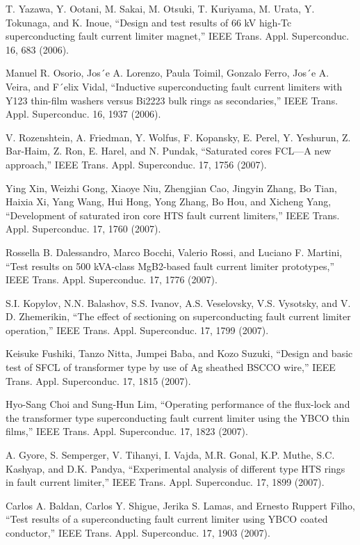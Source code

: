 \noindent [9.134] T. Yazawa, Y. Ootani, M. Sakai, M. Otsuki, T. Kuriyama, M. Urata, Y. Tokunaga,
and K. Inoue, ``Design and test results of 66 kV high-Tc superconducting fault
current limiter magnet,” IEEE Trans. Appl. Superconduc. 16, 683 (2006).

\noindent [9.135] Manuel R. Osorio, Jos´e A. Lorenzo, Paula Toimil, Gonzalo Ferro, Jos´e A. Veira,
and F´elix Vidal, ``Inductive superconducting fault current limiters with Y123
thin-film washers versus Bi2223 bulk rings as secondaries,” IEEE Trans. Appl.
Superconduc. 16, 1937 (2006).

\noindent [9.136] V. Rozenshtein, A. Friedman, Y. Wolfus, F. Kopansky, E. Perel, Y. Yeshurun,
Z. Bar-Haim, Z. Ron, E. Harel, and N. Pundak, ``Saturated cores FCL—A new
approach,” IEEE Trans. Appl. Superconduc. 17, 1756 (2007).

\noindent [9.137] Ying Xin, Weizhi Gong, Xiaoye Niu, Zhengjian Cao, Jingyin Zhang, Bo Tian,
Haixia Xi, Yang Wang, Hui Hong, Yong Zhang, Bo Hou, and Xicheng Yang,
``Development of saturated iron core HTS fault current limiters,” IEEE Trans.
Appl. Superconduc. 17, 1760 (2007).

\noindent [9.138] Rossella B. Dalessandro, Marco Bocchi, Valerio Rossi, and Luciano F. Martini,
``Test results on 500 kVA-class MgB2-based fault current limiter prototypes,”
IEEE Trans. Appl. Superconduc. 17, 1776 (2007).

\noindent [9.139] S.I. Kopylov, N.N. Balashov, S.S. Ivanov, A.S. Veselovsky, V.S. Vysotsky, and V.
D. Zhemerikin, ``The effect of sectioning on superconducting fault current limiter
operation,” IEEE Trans. Appl. Superconduc. 17, 1799 (2007).

\noindent [9.140] Keisuke Fushiki, Tanzo Nitta, Jumpei Baba, and Kozo Suzuki, ``Design and basic
test of SFCL of transformer type by use of Ag sheathed BSCCO wire,” IEEE
Trans. Appl. Superconduc. 17, 1815 (2007).

\noindent [9.141] Hyo-Sang Choi and Sung-Hun Lim, ``Operating performance of the flux-lock and
the transformer type superconducting fault current limiter using the YBCO thin
films,” IEEE Trans. Appl. Superconduc. 17, 1823 (2007).

\noindent [9.142] A. Gyore, S. Semperger, V. Tihanyi, I. Vajda, M.R. Gonal, K.P. Muthe, S.C. Kashyap,
and D.K. Pandya, ``Experimental analysis of different type HTS rings in
fault current limiter,” IEEE Trans. Appl. Superconduc. 17, 1899 (2007).

\noindent [9.143] Carlos A. Baldan, Carlos Y. Shigue, Jerika S. Lamas, and Ernesto Ruppert Filho,
``Test results of a superconducting fault current limiter using YBCO coated conductor,”
IEEE Trans. Appl. Superconduc. 17, 1903 (2007).

